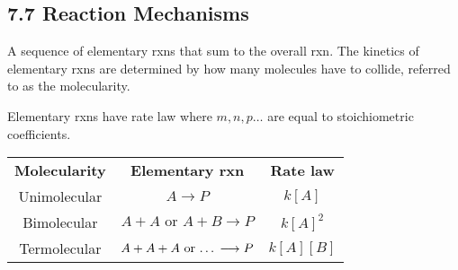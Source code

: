 \subsection{7.7 Reaction Mechanisms}
    A sequence of elementary rxns that sum to the overall rxn. The kinetics of elementary rxns are determined by
    how many molecules have to collide, referred to as the molecularity.\\
    \columnbreak

    Elementary rxns have rate law where $m,n,p\dots$ are equal to stoichiometric coefficients.
    \vspace*{0.5em}
    
    \begin{center}
        \begin{tabular}{ |c|c|c| } 
         \hline
         \textbf{Molecularity} & \textbf{Elementary rxn} & \textbf{Rate law} \\
         Unimolecular & $A \longrightarrow P$ & $k[A]$ \\
         Bimolecular & $A + A \textrm{ or } A + B \longrightarrow P$ & $k[A]^2$ \\
         Termolecular & $A + A + A \textrm{ or \dots} \longrightarrow P$ & $k[A][B]$ \\
         \hline
        \end{tabular}
    \end{center}